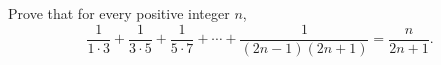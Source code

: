 Prove that for every positive integer $n$,
\[\dfrac1{1\cdot3}+\dfrac1{3\cdot5}+\dfrac1{5\cdot7}+\cdots+\dfrac1{(2n-1)(2n+1)}=\dfrac{n}{2n+1}.\]
